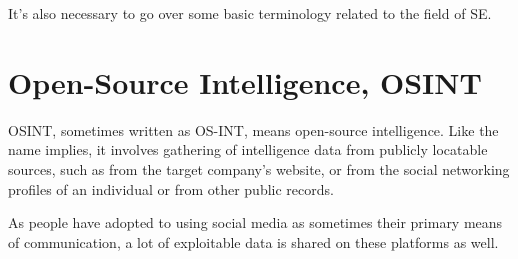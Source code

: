 It's also necessary to go over some basic terminology related to the field of SE.


\section{Open-Source Intelligence, OSINT}

OSINT, sometimes written as OS-INT, means open-source intelligence. Like the name implies, it involves gathering of intelligence data from publicly locatable sources, such as from the target company's website, or from the social networking profiles of an individual or from other public records.


As people have adopted to using social media as sometimes their primary means of communication, a lot of exploitable data is shared on these platforms as well.